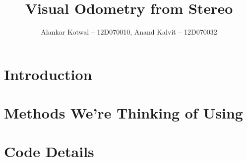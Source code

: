 \documentclass[11pt]{report}
\title{Visual Odometry from Stereo}
\author{Alankar Kotwal -- 12D070010, Anand Kalvit -- 12D070032}
\begin{document}
\maketitle
\newpage

\section*{Introduction}

\section*{Methods We're Thinking of Using}

\section*{Code Details}
\end{document}
